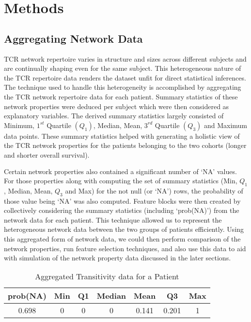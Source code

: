 \chapter{Methods}

\section{Aggregating Network Data}\label{sec:aggregdata}
TCR network repertoire varies in structure and sizes across different subjects and are continually shaping even for the same subject. This heterogeneous nature of the TCR repertoire data renders the dataset unfit for direct statistical inferences. The technique used to handle this heterogeneity is accomplished by aggregating the TCR network repertoire data for each patient. Summary statistics of these network properties were deduced per subject which were then considered as explanatory variables. The derived summary statistics largely consisted of Minimum, $1^{st}$ Quartile $(Q_1)$, Median, Mean, $3^{rd}$ Quartile $(Q_3)$ and Maximum data points. These summary statistics helped with generating a holistic view of the TCR network properties for the patients belonging to the two cohorts (longer and shorter overall survival).\par
Certain network properties also contained a significant number of \lq NA' values. For those properties along with computing the set of summary statistics (Min, $Q_1$, Median, Mean, $Q_3$ and Max) for the not null (or \lq NA') rows, the probability of those value being \lq NA' was also computed. Feature blocks were then created by collectively considering the summary statistics (including \lq prob(NA)') from the network data for each patient. This technique allowed us to represent the heterogeneous network data between the two groups of patients efficiently. Using this aggregated form of network data, we could then perform comparison of the network properties, run feature selection techniques, and also use this data to aid with simulation of the network property data discussed in the later sections.\par
\begin{table}[h]
\centering
\caption{Aggregated Transitivity data for a Patient }
\begin{tabular}{|c|c|c|c|c|c|c|}
\hline
\cellcolor[HTML]{D9E1F2}prob(NA) & \cellcolor[HTML]{D9E1F2}Min & \cellcolor[HTML]{D9E1F2}Q1 & \cellcolor[HTML]{D9E1F2}Median & \cellcolor[HTML]{D9E1F2}Mean  & \cellcolor[HTML]{D9E1F2}Q3    & \cellcolor[HTML]{D9E1F2}Max \\
\hline
0.698  & 0   & 0  & 0      & 0.141 & 0.201 & 1\\ \hline
\end{tabular}
\label{tab:aggreg_transitivity}
\end{table}

